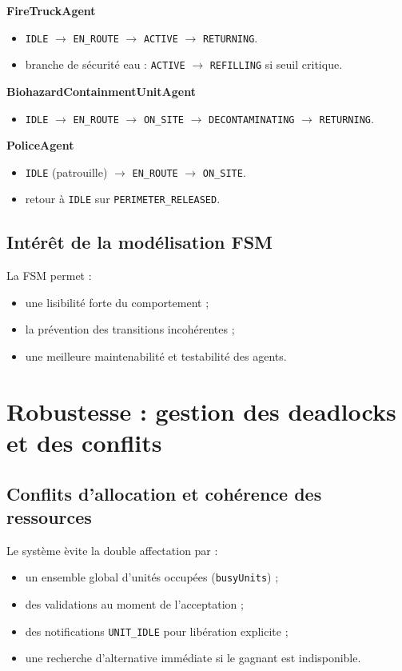 \documentclass[12pt,a4paper]{article}
\begin{document}
\textbf{FireTruckAgent}
\begin{itemize}
    \item \texttt{IDLE} $\rightarrow$ \texttt{EN\_ROUTE} $\rightarrow$ \texttt{ACTIVE} $\rightarrow$ \texttt{RETURNING}.
    \item branche de s\'ecurit\'e eau : \texttt{ACTIVE} $\rightarrow$ \texttt{REFILLING} si seuil critique.
\end{itemize}

\textbf{BiohazardContainmentUnitAgent}
\begin{itemize}
    \item \texttt{IDLE} $\rightarrow$ \texttt{EN\_ROUTE} $\rightarrow$ \texttt{ON\_SITE} $\rightarrow$ \texttt{DECONTAMINATING} $\rightarrow$ \texttt{RETURNING}.
\end{itemize}

\textbf{PoliceAgent}
\begin{itemize}
    \item \texttt{IDLE} (patrouille) $\rightarrow$ \texttt{EN\_ROUTE} $\rightarrow$ \texttt{ON\_SITE}.
    \item retour \`a \texttt{IDLE} sur \texttt{PERIMETER\_RELEASED}.
\end{itemize}

\subsection{Int\'er\^et de la mod\'elisation FSM}
La FSM permet :
\begin{itemize}
    \item une lisibilit\'e forte du comportement ;
    \item la pr\'evention des transitions incoh\'erentes ;
    \item une meilleure maintenabilit\'e et testabilit\'e des agents.
\end{itemize}

\section{Robustesse : gestion des deadlocks et des conflits}
\subsection{Conflits d'allocation et coh\'erence des ressources}
Le syst\`eme \`evite la double affectation par :
\begin{itemize}
    \item un ensemble global d'unit\'es occup\'ees (\texttt{busyUnits}) ;
    \item des validations au moment de l'acceptation ;
    \item des notifications \texttt{UNIT\_IDLE} pour lib\'eration explicite ;
    \item une recherche d'alternative imm\'ediate si le gagnant est indisponible.
\end{itemize}
\end{document}
